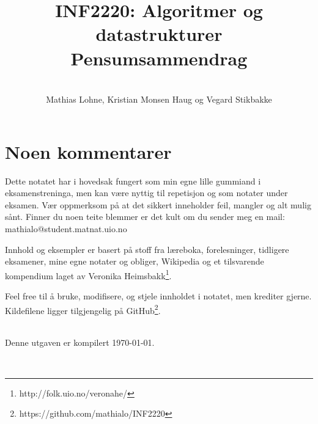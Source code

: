 \documentclass[10pt, norsk, a4paper, sans, hidelinks, twoside]{article}
\title{\titlefontthin INF2220: Algoritmer og datastrukturer \\ Pensumsammendrag}
\author{\vspace{30pt}\\\titlefontthin Mathias Lohne, Kristian Monsen Haug og Vegard Stikbakke}
\date{}
\newcommand{\mono}[1]{{\monofont \small #1}}
\numberwithin{myTheo}{subsection}
\begin{document}
\maketitle
\thispagestyle{empty}
\newpage

\thispagestyle{plain}

\section*{Noen kommentarer}
Dette notatet har i hovedsak fungert som min egne lille gummiand i eksamenstreninga, men kan være nyttig til repetisjon og som notater under eksamen. Vær oppmerksom på at det sikkert inneholder feil, mangler og alt mulig sånt. Finner du noen teite blemmer er det kult om du sender meg en mail: \mono{mathialo@student.matnat.uio.no}

Innhold og eksempler er basert på stoff fra læreboka, forelesninger, tidligere eksamener, mine egne notater og obliger, Wikipedia og et tilsvarende kompendium laget av Veronika Heimsbakk\footnote{http://folk.uio.no/veronahe/}.

Feel free til å bruke, modifisere, og stjele innholdet i notatet, men krediter gjerne. Kildefilene ligger tilgjengelig på GitHub\footnote{https://github.com/mathialo/INF2220}.

~\\Denne utgaven er kompilert \today.

~\\

\newpage
\thispagestyle{plain}

\tableofcontents
\thispagestyle{plain}
\newpage
{}


\newpage

\newpage

\newpage

\newpage

\newpage

\newpage

\newpage

\end{document}
